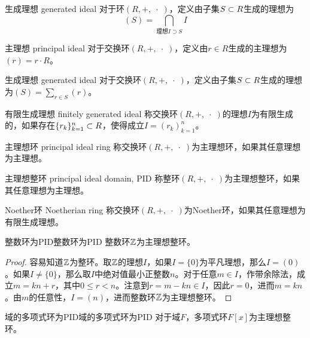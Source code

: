 \begin{definition}{生成理想 generated ideal}
	对于环$(R,+,\;\cdot\;)$，定义由子集$S\subset R$生成的理想为
	$$
	(S)=\bigcap_{\text{理想}I\supset S}I
	$$
\end{definition}

\begin{definition}{主理想 principal ideal}
	对于交换环$(R,+,\;\cdot\;)$，定义由$r\in R$生成的主理想为$(r)=r\cdot R$。
\end{definition}

\begin{definition}{生成理想 generated ideal}
	对于交换环$(R,+,\;\cdot\;)$，定义由子集$S\subset R$生成的理想为$\displaystyle( S )=\sum_{r\in S}(r)$。
\end{definition}

\begin{definition}{有限生成理想 finitely generated ideal}
	称交换环$(R,+,\;\cdot\;)$的理想$I$为有限生成的，如果存在$\{ r_k \}_{k=1}^n\subset R$，使得成立$I=(r_k)_{k=1}^n$。
\end{definition}

\begin{definition}{主理想环 principal ideal ring}
	称交换环$(R,+,\;\cdot\;)$为主理想环，如果其任意理想为主理想。
\end{definition}

\begin{definition}{主理想整环 principal ideal domain, PID}
	称整环$(R,+,\;\cdot\;)$为主理想整环，如果其任意理想为主理想。
\end{definition}

\begin{definition}{Noether环 Noetherian ring}
	称交换环$(R,+,\;\cdot\;)$为Noether环，如果其任意理想为有限生成理想。
\end{definition}

\begin{proposition}{整数环为PID}{整数环为PID}
	整数环$\mathbb{Z}$为主理想整环。
\end{proposition}

\begin{proof}
	容易知道$\mathbb{Z}$为整环。取$\mathbb{Z}$的理想$I$，如果$I=\{0\}$为平凡理想，那么$I=(0)$。如果$I\ne\{0\}$，那么取$I$中绝对值最小正整数$n$。对于任意$m\in I$，作带余除法，成立$m=kn+r$，其中$0\le r<n$。注意到$r=m-kn\in I$，因此$r=0$，进而$m=kn$。由$m$的任意性，$I=(n)$，进而整数环$\mathbb{Z}$为主理想整环。
\end{proof}

\begin{proposition}{域的多项式环为PID}{域的多项式环为PID}
	对于域$F$，多项式环$F[x]$为主理想整环。
\end{proposition}


